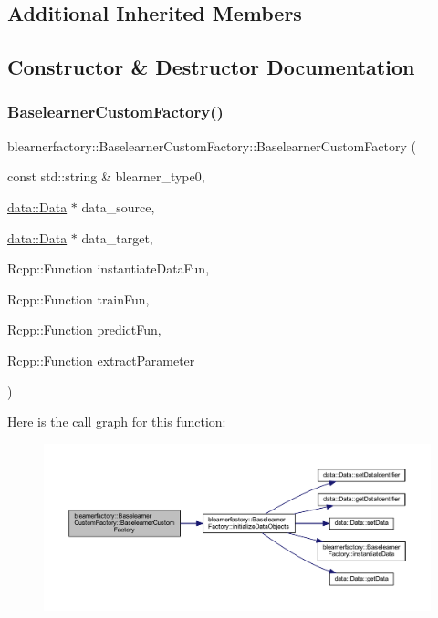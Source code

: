 \subsection*{Additional Inherited Members}


\subsection{Constructor \& Destructor Documentation}
\mbox{\label{classblearnerfactory_1_1_baselearner_custom_factory_a17a9ea35c905f9641f684db8928d3fa8}} 
\subsubsection{\texorpdfstring{Baselearner\+Custom\+Factory()}{BaselearnerCustomFactory()}}
{\footnotesize\ttfamily blearnerfactory\+::\+Baselearner\+Custom\+Factory\+::\+Baselearner\+Custom\+Factory (\begin{DoxyParamCaption}\item[{const std\+::string \&}]{blearner\+\_\+type0,  }\item[{\mbox{\hyperlink{classdata_1_1_data}{data\+::\+Data}} $\ast$}]{data\+\_\+source,  }\item[{\mbox{\hyperlink{classdata_1_1_data}{data\+::\+Data}} $\ast$}]{data\+\_\+target,  }\item[{Rcpp\+::\+Function}]{instantiate\+Data\+Fun,  }\item[{Rcpp\+::\+Function}]{train\+Fun,  }\item[{Rcpp\+::\+Function}]{predict\+Fun,  }\item[{Rcpp\+::\+Function}]{extract\+Parameter }\end{DoxyParamCaption})}

Here is the call graph for this function\+:
\nopagebreak
\begin{figure}[H]
\begin{center}
\leavevmode
\includegraphics[width=350pt]{classblearnerfactory_1_1_baselearner_custom_factory_a17a9ea35c905f9641f684db8928d3fa8_cgraph}
\end{center}
\end{figure}



